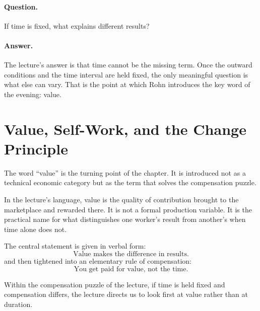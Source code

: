 \paragraph{Question.} If time is fixed, what explains different results?

\paragraph{Answer.} The lecture's answer is that time cannot be the missing term. Once the outward conditions and the time interval are held fixed, the only meaningful question is what else can vary. That is the point at which Rohn introduces the key word of the evening: value.

\section{Value, Self-Work, and the Change Principle}

The word ``value'' is the turning point of the chapter. It is introduced not as a technical economic category but as the term that solves the compensation puzzle.

\begin{definition}
In the lecture's language, value is the quality of contribution brought to the marketplace and rewarded there. It is not a formal production variable. It is the practical name for what distinguishes one worker's result from another's when time alone does not.
\end{definition}

The central statement is given in verbal form:
\begin{equation}
\text{Value makes the difference in results.}
\end{equation}
and then tightened into an elementary rule of compensation:
\begin{equation}
\text{You get paid for value, not the time.}
\end{equation}

\begin{proposition}
Within the compensation puzzle of the lecture, if time is held fixed and compensation differs, the lecture directs us to look first at value rather than at duration.
\end{proposition}

